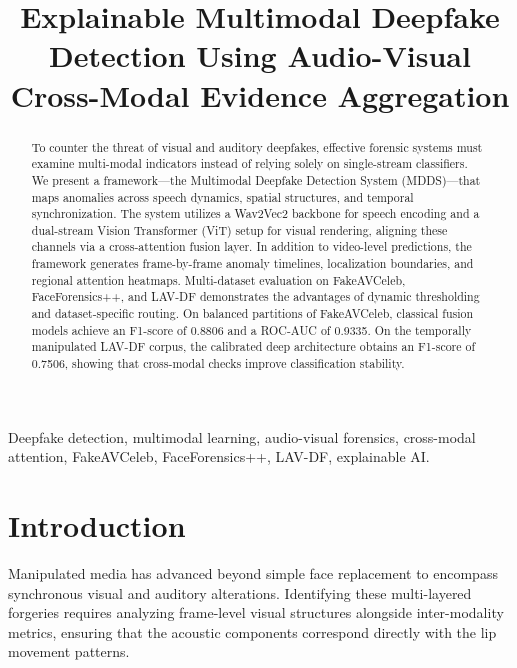 \documentclass[conference]{IEEEtran}
\begin{document}
\title{Explainable Multimodal Deepfake Detection Using Audio-Visual Cross-Modal Evidence Aggregation}

\author{
}

\maketitle

\begin{abstract}
To counter the threat of visual and auditory deepfakes, effective forensic systems must examine multi-modal indicators instead of relying solely on single-stream classifiers. We present a framework—the Multimodal Deepfake Detection System (MDDS)—that maps anomalies across speech dynamics, spatial structures, and temporal synchronization. The system utilizes a Wav2Vec2 backbone for speech encoding and a dual-stream Vision Transformer (ViT) setup for visual rendering, aligning these channels via a cross-attention fusion layer. In addition to video-level predictions, the framework generates frame-by-frame anomaly timelines, localization boundaries, and regional attention heatmaps. Multi-dataset evaluation on FakeAVCeleb, FaceForensics++, and LAV-DF demonstrates the advantages of dynamic thresholding and dataset-specific routing. On balanced partitions of FakeAVCeleb, classical fusion models achieve an F1-score of 0.8806 and a ROC-AUC of 0.9335. On the temporally manipulated LAV-DF corpus, the calibrated deep architecture obtains an F1-score of 0.7506, showing that cross-modal checks improve classification stability.
\end{abstract}

\begin{IEEEkeywords}
Deepfake detection, multimodal learning, audio-visual forensics, cross-modal attention, FakeAVCeleb, FaceForensics++, LAV-DF, explainable AI.
\end{IEEEkeywords}

\section{Introduction}
Manipulated media has advanced beyond simple face replacement to encompass synchronous visual and auditory alterations. Identifying these multi-layered forgeries requires analyzing frame-level visual structures alongside inter-modality metrics, ensuring that the acoustic components correspond directly with the lip movement patterns. 
\end{document}
